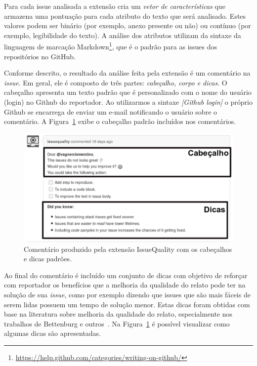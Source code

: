 Para cada issue analisada a extensão cria um \textit{vetor de características}
que armazena uma pontuação para cada atributo do texto que será analisado. Estes
valores podem ser binário (por exemplo, anexo presente ou não) ou contínuo (por
exemplo, legibilidade do texto). A análise dos atributos utilizam da sintaxe da
linguagem de marcação
Markdown\footnote{\url{https://help.github.com/categories/writing-on-github/}},
que é o padrão para as issues dos repositórios no GitHub.

Conforme descrito, o resultado da análise feita pela extensão é um comentário na
\textit{issue}. Em geral, ele é composto de três partes: \textit{cabeçalho,
    corpo e dicas}. O cabeçalho apresenta um texto padrão que é personalizado
com o nome do usuário (login) no Github do reportador. Ao utilizarmos a sintaxe
\textit{\@[Github login]} o próprio Github se encarrega de enviar um e-mail
notificando o usuário sobre o comentário. A Figura~\ref{fig:issue_original}
exibe o cabeçalho padrão incluídos nos comentários.

\begin{figure}[htpb]
    \centering
    \includegraphics[width=0.8\linewidth]{chapter-implementacao-extensoes-fgrm/img/issue_original.png}
    \caption{Comentário produzido pela extensão IssueQuality com os cabeçalhos e
        dicas padrões.}
\label{fig:issue_original}
\end{figure}

Ao final do comentário é incluído um conjunto de dicas com objetivo de reforçar
com reportador os benefícios que a melhoria da qualidade do relato pode ter na
solução de sua \textit{issue}, como por exemplo dizendo que issues que são mais
fáceis de serem lidas possuem um tempo de solução menor. Estas dicas foram
obtidas com base na literatura sobre melhoria da qualidade do relato,
especialmente nos trabalhos de Bettenburg e outros~\cite{bettenburg2007quality,
    bettenburg2008makes}. Na Figura~\ref{fig:issue_original} é possível
visualizar como algumas dicas são apresentadas.

